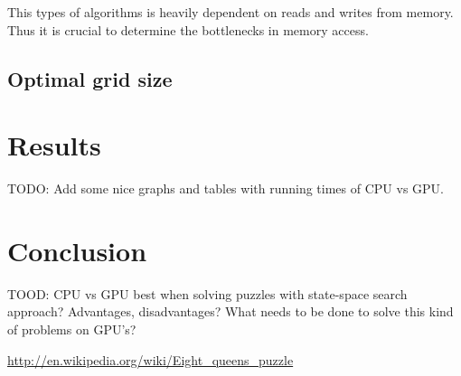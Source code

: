 \documentclass{article}
\begin{document}
This types of algorithms is heavily dependent on reads and writes from memory. Thus it is crucial 
to determine the bottlenecks in memory access. 


\subsection{Optimal grid size} %
\label{sub:optimal_grid_size}


\section{Results}

TODO: Add some nice graphs and tables with running times of CPU vs GPU.

\section{Conclusion}

TOOD: CPU vs GPU best when solving puzzles with state-space search approach? Advantages, 
disadvantages? What needs to be done to solve this kind of problems on GPU's?

\begin{thebibliography}{9}

	\url{http://en.wikipedia.org/wiki/Eight_queens_puzzle}

\end{thebibliography} 
\end{document}
